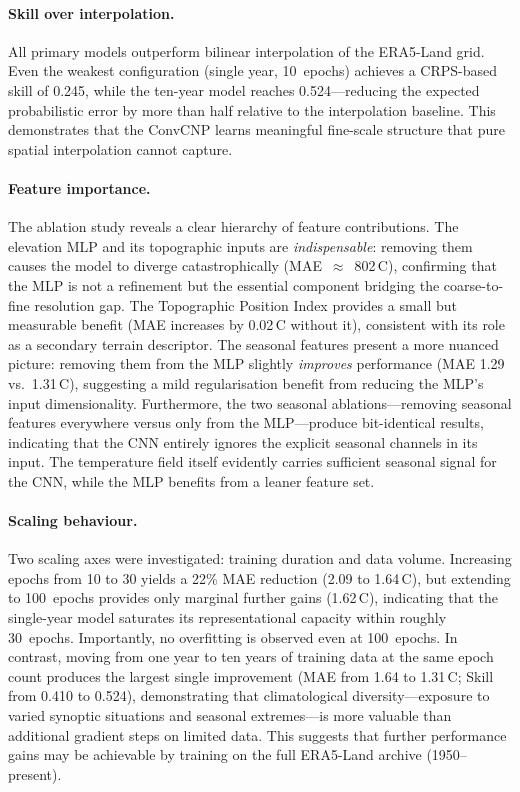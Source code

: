 \paragraph{Skill over interpolation.}
All primary models outperform bilinear interpolation of the ERA5-Land grid. Even the weakest configuration (single year, 10~epochs) achieves a CRPS-based skill of 0.245, while the ten-year model reaches 0.524---reducing the expected probabilistic error by more than half relative to the interpolation baseline. This demonstrates that the ConvCNP learns meaningful fine-scale structure that pure spatial interpolation cannot capture.

\paragraph{Feature importance.}
The ablation study reveals a clear hierarchy of feature contributions. The elevation MLP and its topographic inputs are \emph{indispensable}: removing them causes the model to diverge catastrophically (MAE~$\approx$~802\,\textdegree C), confirming that the MLP is not a refinement but the essential component bridging the coarse-to-fine resolution gap. The Topographic Position Index provides a small but measurable benefit (MAE increases by 0.02\,\textdegree C without it), consistent with its role as a secondary terrain descriptor. The seasonal features present a more nuanced picture: removing them from the MLP slightly \emph{improves} performance (MAE 1.29 vs.\ 1.31\,\textdegree C), suggesting a mild regularisation benefit from reducing the MLP's input dimensionality. Furthermore, the two seasonal ablations---removing seasonal features everywhere versus only from the MLP---produce bit-identical results, indicating that the CNN entirely ignores the explicit seasonal channels in its input. The temperature field itself evidently carries sufficient seasonal signal for the CNN, while the MLP benefits from a leaner feature set.

\paragraph{Scaling behaviour.}
Two scaling axes were investigated: training duration and data volume. Increasing epochs from 10 to 30 yields a 22\% MAE reduction (2.09 to 1.64\,\textdegree C), but extending to 100~epochs provides only marginal further gains (1.62\,\textdegree C), indicating that the single-year model saturates its representational capacity within roughly 30~epochs. Importantly, no overfitting is observed even at 100~epochs. In contrast, moving from one year to ten years of training data at the same epoch count produces the largest single improvement (MAE from 1.64 to 1.31\,\textdegree C; Skill from 0.410 to 0.524), demonstrating that climatological diversity---exposure to varied synoptic situations and seasonal extremes---is more valuable than additional gradient steps on limited data. This suggests that further performance gains may be achievable by training on the full ERA5-Land archive (1950--present).

